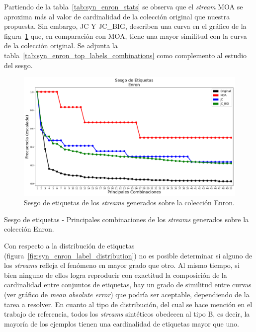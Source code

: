 Partiendo de la tabla~\ref{tab:syn_enron_stats} se observa que el
\textit{stream} MOA se aproxima más al valor de cardinalidad de la colección
original que nuestra propuesta. Sin embargo, JC Y JC\_BIG, describen una curva
en el gráfico de la figura~\ref{fig:syn_enron_label_skew} que, en comparación
con MOA, tiene una mayor similitud con la curva de la colección original.  Se
adjunta la tabla~\ref{tab:syn_enron_top_labels_combinations} como complemento al
estudio del sesgo.

\begin{figure}[htbp]
	\includegraphics[width=\linewidth]{figures/experiments/syn/enron/label_skew.png}
	\caption{Sesgo de etiquetas de los \textit{streams} generados sobre la colección
		Enron.}
	\label{fig:syn_enron_label_skew}
\end{figure}

\begin{table}[htbp]
	\centering
	\begin{adjustbox}{max width=\textwidth}
		
	\end{adjustbox}
	\caption{Sesgo de etiquetas - Principales combinaciones de los
		\textit{streams} generados sobre la colección Enron.}
	\label{tab:syn_enron_top_labels_combinations}
\end{table}

Con respecto a la distribución de etiquetas
(figura~\ref{fig:syn_enron_label_distribution}) no es posible determinar si
alguno de los \textit{streams} refleja el fenómeno en mayor grado que otro. Al
mismo tiempo, si bien ninguno de ellos logra reproducir con exactitud la
composición de la cardinalidad entre conjuntos de etiquetas, hay un grado de
similitud entre curvas (ver gráfico de \textit{mean absolute error}) que podría
ser aceptable, dependiendo de la tarea a resolver. En cuanto al tipo de
distribución, del cual se hace mención en el trabajo de referencia, todos los
\textit{streams} sintéticos obedecen al tipo B, es decir, la mayoría de los
ejemplos tienen una cardinalidad de etiquetas mayor que uno.

